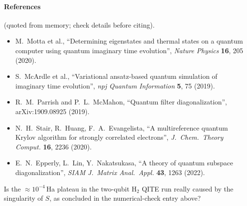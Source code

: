 \documentclass[11pt,a4paper]{article}
\begin{document}
\paragraph{References} (quoted from memory; check details before citing).
\begin{itemize}
\item M.~Motta et al., ``Determining eigenstates and thermal states on a quantum computer using quantum imaginary time evolution'', \emph{Nature Physics} \textbf{16}, 205 (2020).
\item S.~McArdle et al., ``Variational ansatz-based quantum simulation of imaginary time evolution'', \emph{npj Quantum Information} \textbf{5}, 75 (2019).
\item R.~M.~Parrish and P.~L.~McMahon, ``Quantum filter diagonalization'', arXiv:1909.08925 (2019).
\item N.~H.~Stair, R.~Huang, F.~A.~Evangelista, ``A multireference quantum Krylov algorithm for strongly correlated electrons'', \emph{J.\ Chem.\ Theory Comput.} \textbf{16}, 2236 (2020).
\item E.~N.~Epperly, L.~Lin, Y.~Nakatsukasa, ``A theory of quantum subspace diagonalization'', \emph{SIAM J.\ Matrix Anal.\ Appl.} \textbf{43}, 1263 (2022).
\end{itemize}


\begin{question}
Is the $\approx10^{-4}$\,Ha plateau in the two-qubit $\mathrm{H}_2$ QITE run really caused by the
singularity of $S$, as concluded in the numerical-check entry above?
\end{question}
\end{document}
